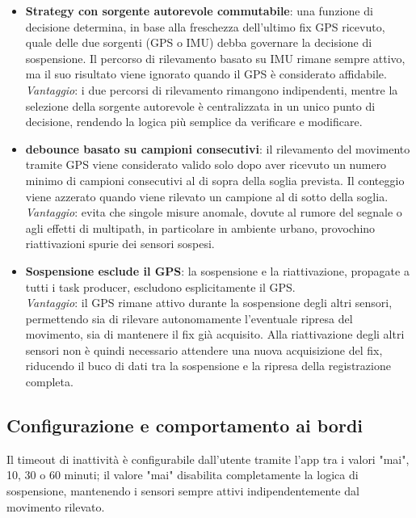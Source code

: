 \begin{itemize}
    \item \textbf{Strategy con sorgente autorevole commutabile}: una funzione di decisione
    determina, in base alla freschezza dell'ultimo fix GPS ricevuto, quale delle due sorgenti
    (GPS o IMU) debba governare la decisione di sospensione. Il percorso di rilevamento basato
    su IMU rimane sempre attivo, ma il suo risultato viene ignorato quando il GPS è considerato
    affidabile.\\
    \textit{Vantaggio}: i due percorsi di rilevamento rimangono indipendenti, mentre la
    selezione della sorgente autorevole è centralizzata in un unico punto di decisione,
    rendendo la logica più semplice da verificare e modificare.

    \item \textbf{\gls{debounce} basato su campioni consecutivi}: il rilevamento del
    movimento tramite GPS viene considerato valido solo dopo aver ricevuto un numero minimo
    di campioni consecutivi al di sopra della soglia prevista. Il conteggio viene azzerato
    quando viene rilevato un campione al di sotto della soglia.\\
    \textit{Vantaggio}: evita che singole misure anomale, dovute al rumore del segnale o agli
    effetti di \gls{multipath}, in particolare in ambiente urbano, provochino riattivazioni
    spurie dei sensori sospesi.

    \item \textbf{Sospensione esclude il GPS}: la sospensione e la riattivazione, propagate
    a tutti i task producer, escludono esplicitamente il GPS.\\
    \textit{Vantaggio}: il GPS rimane attivo durante la sospensione degli altri sensori,
    permettendo sia di rilevare autonomamente l'eventuale ripresa del movimento, sia di
    mantenere il fix già acquisito. Alla riattivazione degli altri sensori non è quindi
    necessario attendere una nuova acquisizione del fix, riducendo il buco di dati tra la
    sospensione e la ripresa della registrazione completa.
\end{itemize}

\subsection{Configurazione e comportamento ai bordi}

Il timeout di inattività è configurabile dall'utente tramite l'app tra i valori "mai", 10, 30 o 60 minuti; il valore "mai"
disabilita completamente la logica di sospensione, mantenendo i sensori sempre attivi indipendentemente dal movimento rilevato.

